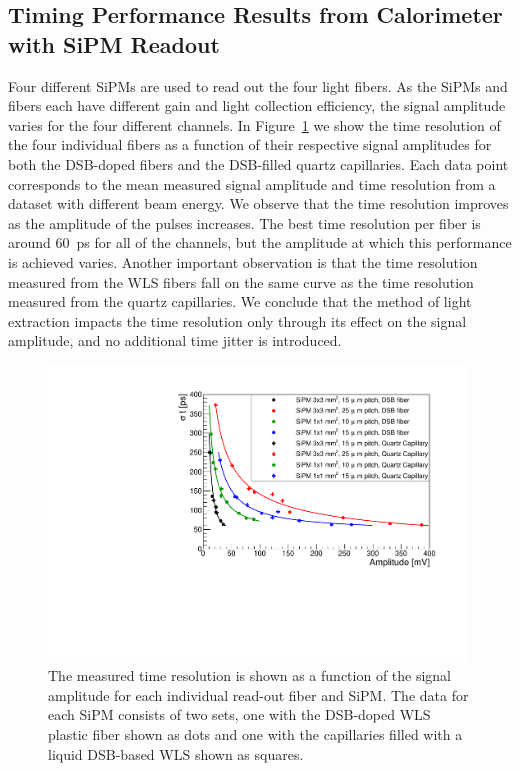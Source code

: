 \subsection{Timing Performance Results from Calorimeter with SiPM Readout}
\label{sec:beamtiming}

Four different SiPMs are used to read out the four light fibers. As the SiPMs
and fibers each have different gain and light collection efficiency, the signal
amplitude varies for the four different channels. In Figure~\ref{TimeResolution}
we show the time resolution of the four individual fibers as a function of their
respective signal amplitudes for both the DSB-doped fibers and the DSB-filled
quartz capillaries. Each data point corresponds to the mean measured 
signal amplitude and time resolution from a dataset 
with different beam energy. We observe that the time resolution improves as the
amplitude of the pulses increases. The best time resolution per fiber is around
$60$~ps for all of the channels, but the amplitude at which this performance is
achieved varies. Another important observation is that the time resolution
measured from the WLS fibers fall on the same curve as the time
resolution measured from the quartz capillaries. We conclude that the method of
light extraction impacts the time resolution only through its effect on the
signal amplitude, and no additional time jitter is introduced. 


\begin{figure}[!htb]
\centering
\includegraphics[width=0.99\textwidth]{figures/ShashlikTimeResolution.pdf}
\caption{\label{TimeResolution} The measured time resolution is shown as a
function of the signal amplitude for each individual read-out fiber and SiPM.
The data for each SiPM consists of two sets, one with the DSB-doped WLS plastic fiber
shown as dots and one with the capillaries filled with a liquid DSB-based WLS shown as
squares. }
\end{figure}



